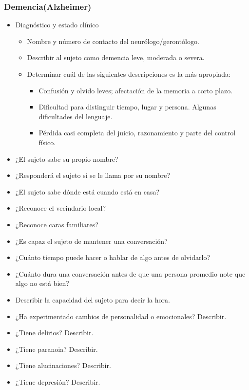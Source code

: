 \subsubsection{Demencia(Alzheimer)}
\begin{itemize}
    \item Diagnóstico y estado clínico
    \begin{itemize}
        \item Nombre y número de contacto del neurólogo/gerontólogo.
        \item Describir al sujeto como demencia leve, moderada o severa.
        \item Determinar cuál de las siguientes descripciones es la más apropiada:
        \begin{itemize}
            \item Confusión y olvido leves; afectación de la memoria a corto plazo.
            \item Dificultad para distinguir tiempo, lugar y persona. Algunas dificultades del lenguaje.
            \item Pérdida casi completa del juicio, razonamiento y parte del control físico.
        \end{itemize}
    \end{itemize}
    \item ¿El sujeto sabe su propio nombre? 
    \item ¿Responderá el sujeto si se le llama por su nombre?
    \item ¿El sujeto sabe dónde está cuando está en casa?
    \item ¿Reconoce el vecindario local?
    \item ¿Reconoce caras familiares?
    \item ¿Es capaz el sujeto de mantener una conversación? 
    \item ¿Cuánto tiempo puede hacer o hablar de algo antes de olvidarlo?
    \item ¿Cuánto dura una conversación antes de que una persona promedio note que algo no está bien?
    \item Describir la capacidad del sujeto para decir la hora.
    \item ¿Ha experimentado cambios de personalidad o emocionales? Describir.
    \item ¿Tiene delirios? Describir.
    \item ¿Tiene paranoia? Describir.
    \item ¿Tiene alucinaciones? Describir.
    \item ¿Tiene depresión? Describir.

\end{itemize}
